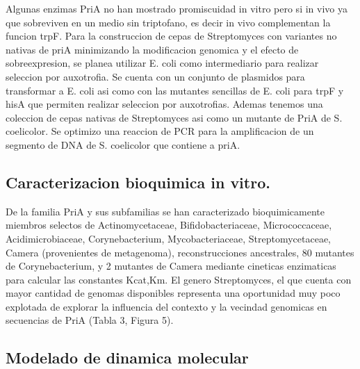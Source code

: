 \documentclass[12pt,twoside]{reedthesis}
\begin{document}
  Algunas enzimas PriA no han mostrado promiscuidad in vitro pero si in
  vivo ya que sobreviven en un medio sin triptofano, es decir in vivo
  complementan la funcion trpF. Para la construccion de cepas de
  Streptomyces con variantes no nativas de priA minimizando la
  modificacion genomica y el efecto de sobreexpresion, se planea utilizar
  E. coli como intermediario para realizar seleccion por auxotrofia. Se
  cuenta con un conjunto de plasmidos para transformar a E. coli asi como
  con las mutantes sencillas de E. coli para trpF y hisA que permiten
  realizar seleccion por auxotrofias. Ademas tenemos una coleccion de
  cepas nativas de Streptomyces asi como un mutante de PriA de S.
  coelicolor. Se optimizo una reaccion de PCR para la amplificacion de un
  segmento de DNA de S. coelicolor que contiene a priA.
  
  \subsection{Caracterizacion bioquimica in
  vitro.}\label{caracterizacion-bioquimica-in-vitro.}
  
  De la familia PriA y sus subfamilias se han caracterizado
  bioquimicamente miembros selectos de Actinomycetaceae,
  Bifidobacteriaceae, Micrococcaceae, Acidimicrobiaceae, Corynebacterium,
  Mycobacteriaceae, Streptomycetaceae, Camera (provenientes de
  metagenoma), reconstrucciones ancestrales, 80 mutantes de
  Corynebacterium, y 2 mutantes de Camera mediante cineticas enzimaticas
  para calcular las constantes Kcat,Km. El genero Streptomyces, el que
  cuenta con mayor cantidad de genomas disponibles representa una
  oportunidad muy poco explotada de explorar la influencia del contexto y
  la vecindad genomicas en secuencias de PriA (Tabla 3, Figura 5).
  
  \subsection{Modelado de dinamica
  molecular}\label{modelado-de-dinamica-molecular}
  
\end{document}
